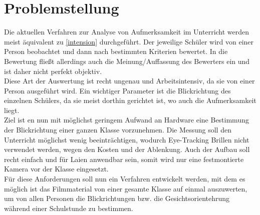 \section{Problemstellung}
\label{Problemstellung}
Die aktuellen Verfahren zur Analyse von Aufmerksamkeit im Unterricht werden meist äquivalent zu \autoref{intension} durchgeführt. Der jeweilige Schüler wird von einer Person beobachtet und dann nach bestimmten Kriterien bewertet. In die Bewertung fließt allerdings auch die Meinung/Auffassung des Bewerters ein und ist daher nicht perfekt objektiv.\\
Diese Art der Auswertung ist recht ungenau und Arbeitsintensiv, da sie von einer Person ausgeführt wird. Ein wichtiger Parameter ist die Blickrichtung des einzelnen Schülers, da sie meist dorthin gerichtet ist, wo auch die Aufmerksamkeit liegt.\cite{MAI_Verhaltensbeobachtung}\\
Ziel ist en nun mit möglichst geringem Aufwand an Hardware eine Bestimmung der Blickrichtung einer ganzen Klasse vorzunehmen. Die Messung soll den Unterricht möglichst wenig beeinträchtigen, wodurch Eye-Tracking Brillen nicht verwendet werden, wegen den Kosten und der Ablenkung. Auch der Aufbau soll recht einfach und für Laien anwendbar sein, somit wird nur eine festmontierte Kamera vor der Klasse eingesetzt.\\
Für diese Anforderungen soll nun ein Verfahren entwickelt werden, mit dem es möglich ist das Filmmaterial von einer gesamte Klasse auf einmal auszuwerten, um von allen Personen die Blickrichtungen bzw. die Gesichtsorientehrung während einer Schulstunde zu bestimmen.
